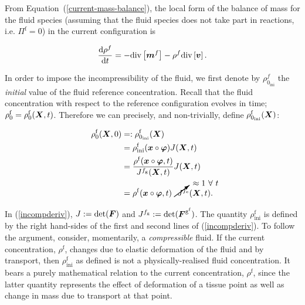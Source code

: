 From \mbox{Equation (\ref{current-mass-balance})}, the local form of
the balance of mass for the fluid species (assuming that the fluid
species does not take part in reactions, i.e. $\Pi^\mathrm{f}=0$) in
the current configuration is

\begin{equation}
\frac{\mathrm{d}\rho^f}{\mathrm{d}t} = - \mathrm{div}\left[\mbox{\boldmath$ m$}^f\right]
- \rho^f \mathrm{div}\left[\mbox{\boldmath$ v$}\right].
\label{fluidtransporteqn}
\end{equation}

\noindent In order to impose the incompressibility of the fluid, we
first denote by $\rho_{0_{\mathrm{ini}}}^{f}$ the {\sl initial} value
of the fluid reference concentration. Recall that the fluid
concentration with respect to the reference configuration evolves in
time; $\rho^\mathrm{f}_0 = \rho^\mathrm{f}_0(\mbox{\boldmath$ X$},t)$. Therefore we can
precisely, and non-trivially, define $\rho_{0_{\mathrm{ini}}} ^
{\mathrm{f}}(\mbox{\boldmath$ X$})$:

\begin{equation}
\begin{split}
\rho_{0}^{\mathrm{f}}(\bX,0)
                   &=:\rho_{0_{\mathrm{ini}}}^{\mathrm{f}}(\bX)\\ 
                   &=\rho_{\mathrm{ini}}^{\mathrm{f}}(\bx\circ\Bvarphi)
                   J(\bX, t)\\ &=\frac{\rho^{\mathrm{f}}
                   (\bx\circ\Bvarphi,t)} {J^{f_\mathrm{g}}(\bX,t)}
                   J(\bX,t)\\ &=\rho^{\mathrm{f}} (\bx\circ\Bvarphi,t)
                   \cancelto{\approx 1\ \forall\ t}
                   {J^{f_\mathrm{e}}}(\bX,t).\\
\label{incompderiv}
\end{split}
\end{equation}

In (\ref{incompderiv}), $J := \mathrm{det}(\mbox{\boldmath$ F$})$ and $J^{f_\mathrm{g}} :=
\mathrm{det}(\mbox{\boldmath$ F$}^{\mathrm{g}^{\mathrm{f}}})$. The quantity
$\rho_{\mathrm{ini}}^{\mathrm{f}}$ is defined by the right hand-sides
of the first and second lines of (\ref{incompderiv}). To follow the
argument, consider, momentarily, a \emph{compressible} fluid. If the
current concentration, $\rho^\mathrm{f}$, changes due to elastic
deformation of the fluid and by transport, then
$\rho_{\mathrm{ini}}^{\mathrm{f}}$ as defined is not a
physically-realised fluid concentration. It bears a purely
mathematical relation to the current concentration, $\rho^\mathrm{f}$,
since the latter quantity represents the effect of deformation of a
tissue point as well as change in mass due to transport at that
point.

